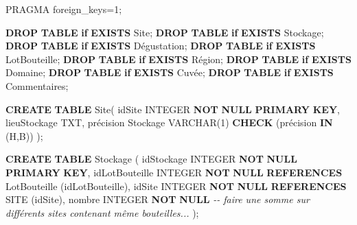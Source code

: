\documentclass[11pt]{article}
\newenvironment{Shaded}{}{}
\newcommand{\KeywordTok}[1]{\textcolor[rgb]{0.00,0.44,0.13}{\textbf{{#1}}}}
\newcommand{\DataTypeTok}[1]{\textcolor[rgb]{0.56,0.13,0.00}{{#1}}}
\newcommand{\DecValTok}[1]{\textcolor[rgb]{0.25,0.63,0.44}{{#1}}}
\newcommand{\StringTok}[1]{\textcolor[rgb]{0.25,0.44,0.63}{{#1}}}
\newcommand{\CommentTok}[1]{\textcolor[rgb]{0.38,0.63,0.69}{\textit{{#1}}}}
\newcommand{\NormalTok}[1]{{#1}}
\newcommand{\ControlFlowTok}[1]{\textcolor[rgb]{0.00,0.44,0.13}{\textbf{{#1}}}}
\newcommand{\OperatorTok}[1]{\textcolor[rgb]{0.40,0.40,0.40}{{#1}}}
\begin{document}
\begin{Shaded}
\begin{Highlighting}[]
\NormalTok{PRAGMA foreign\_keys}\OperatorTok{=}\DecValTok{1}\NormalTok{;}

\KeywordTok{DROP} \KeywordTok{TABLE} \ControlFlowTok{if} \KeywordTok{EXISTS}\NormalTok{ Site;}
\KeywordTok{DROP} \KeywordTok{TABLE} \ControlFlowTok{if} \KeywordTok{EXISTS}\NormalTok{ Stockage;}
\KeywordTok{DROP} \KeywordTok{TABLE} \ControlFlowTok{if} \KeywordTok{EXISTS}\NormalTok{ Dégustation;}
\KeywordTok{DROP} \KeywordTok{TABLE} \ControlFlowTok{if} \KeywordTok{EXISTS}\NormalTok{ LotBouteille;}
\KeywordTok{DROP} \KeywordTok{TABLE} \ControlFlowTok{if} \KeywordTok{EXISTS}\NormalTok{ Région;}
\KeywordTok{DROP} \KeywordTok{TABLE} \ControlFlowTok{if} \KeywordTok{EXISTS}\NormalTok{ Domaine;}
\KeywordTok{DROP} \KeywordTok{TABLE} \ControlFlowTok{if} \KeywordTok{EXISTS}\NormalTok{ Cuvée; }
\KeywordTok{DROP} \KeywordTok{TABLE} \ControlFlowTok{if} \KeywordTok{EXISTS}\NormalTok{ Commentaires;}

\KeywordTok{CREATE} \KeywordTok{TABLE}\NormalTok{ Site(}
\NormalTok{    idSite }\DataTypeTok{INTEGER} \KeywordTok{NOT} \KeywordTok{NULL} \KeywordTok{PRIMARY} \KeywordTok{KEY}\NormalTok{,}
\NormalTok{    lieuStockage TXT,}
\NormalTok{    précision Stockage }\DataTypeTok{VARCHAR}\NormalTok{(}\DecValTok{1}\NormalTok{) }\KeywordTok{CHECK}\NormalTok{ (précision }\KeywordTok{IN}\NormalTok{ (}\StringTok{\textquotesingle{}H\textquotesingle{}}\NormalTok{,}\StringTok{\textquotesingle{}B\textquotesingle{}}\NormalTok{))}
\NormalTok{    );}

\KeywordTok{CREATE} \KeywordTok{TABLE}\NormalTok{ Stockage (}
\NormalTok{    idStockage }\DataTypeTok{INTEGER} \KeywordTok{NOT} \KeywordTok{NULL} \KeywordTok{PRIMARY} \KeywordTok{KEY}\NormalTok{,}
\NormalTok{    idLotBouteille }\DataTypeTok{INTEGER} \KeywordTok{NOT} \KeywordTok{NULL} \KeywordTok{REFERENCES}\NormalTok{ LotBouteille (idLotBouteille),}
\NormalTok{    idSite }\DataTypeTok{INTEGER} \KeywordTok{NOT} \KeywordTok{NULL} \KeywordTok{REFERENCES}\NormalTok{ SITE (idSite),}
\NormalTok{    nombre }\DataTypeTok{INTEGER} \KeywordTok{NOT} \KeywordTok{NULL}   \CommentTok{{-}{-} faire une somme sur différents sites contenant même bouteilles...}
\NormalTok{    );}


\end{Highlighting}
\end{Shaded}
\end{document}
